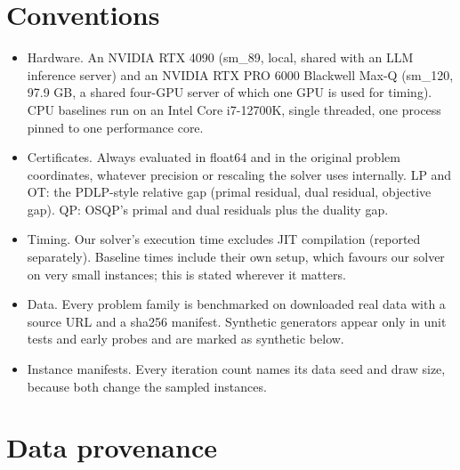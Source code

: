 \documentclass[11pt]{article}
\begin{document}
\section{Conventions}
\label{app:log:conventions}

\begin{itemize}
\item Hardware. An NVIDIA RTX 4090 (sm\_89, local, shared with an LLM
 inference server) and an NVIDIA RTX PRO 6000 Blackwell Max-Q (sm\_120,
 97.9 GB, a shared four-GPU server of which one GPU is used for timing).
 CPU baselines run on an Intel Core i7-12700K, single threaded, one process
 pinned to one performance core.
\item Certificates. Always evaluated in float64 and in the original problem
 coordinates, whatever precision or rescaling the solver uses internally.
 LP and OT: the PDLP-style relative gap (primal residual, dual residual,
 objective gap). QP: OSQP's primal and dual residuals plus the duality gap.
\item Timing. Our solver's execution time excludes JIT compilation (reported
 separately). Baseline times include their own setup, which favours our
 solver on very small instances; this is stated wherever it matters.
\item Data. Every problem family is benchmarked on downloaded real data with
 a source URL and a sha256 manifest. Synthetic generators appear only in
 unit tests and early probes and are marked as synthetic below.
\item Instance manifests. Every iteration count names its data seed and draw
 size, because both change the sampled instances.
\end{itemize}

\section{Data provenance}
\label{app:log:data}
\end{document}
